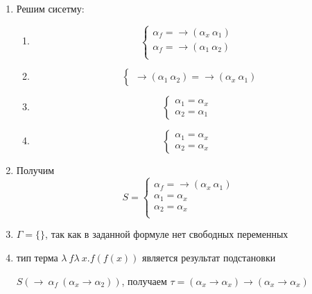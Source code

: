 	\begin{enumerate}
		\item Решим сисетму:\par 
			\begin{enumerate}
			\item \[\begin{cases}
				\alpha_f=\rightarrow(\alpha_x\:\alpha_1)&\\
				\alpha_f=\rightarrow(\alpha_1\:\alpha_2)&\\
			\end{cases}\]
			\item \[
				\begin{cases}
				\rightarrow(\alpha_1\:\alpha_2)=\rightarrow(\alpha_x\:\alpha_1)
				\end{cases}\]
			\item \[
				\begin{cases}
				\alpha_1=\alpha_x&\\
				\alpha_2=\alpha_1
				\end{cases}\]
			\item \[
				\begin{cases}
				\alpha_1=\alpha_x&\\
				\alpha_2=\alpha_x
				\end{cases}\]
\end{enumerate}					
		\item  Получим \[S=\begin{cases}
						\alpha_f=\rightarrow(\alpha_x\:\alpha_1)&\\
						\alpha_1=\alpha_x&\\
						\alpha_2=\alpha_x&\\
				\end{cases}\]
		\item $\Gamma=\{\}$, так как в заданной формуле нет свободных переменных
		\item тип  терма $\lambda\:f\lambda\:x.f(f(x))$ является результат подстановки\par $S(\rightarrow\:\alpha_f\:(\alpha_x\rightarrow\alpha_2))$, получаем $\tau=(\alpha_x\rightarrow\alpha_x)\rightarrow(\alpha_x\rightarrow\alpha_x)$
	\end{enumerate}

